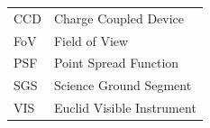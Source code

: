\documentclass[11pt]{EuclidVIS}
\numberwithin{table}{section}
\numberwithin{figure}{section}
\begin{document}
\begin{tabular}{l l}
CCD & Charge Coupled Device \\
FoV & Field of View \\
PSF & Point Spread Function\\
SGS & Science Ground Segment \\
VIS & Euclid Visible Instrument\\
\end{tabular}
\end{document}
